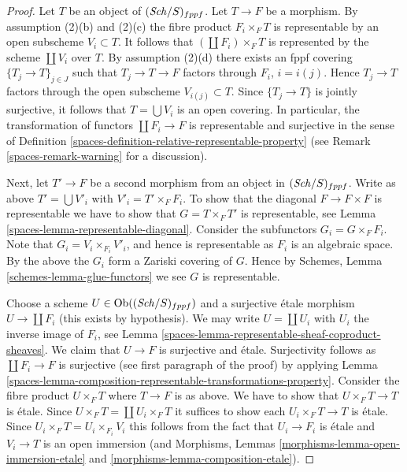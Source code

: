 \begin{proof}

Let $T$ be an object of $(\mathit{Sch}/S)_{fppf}$. Let $T \to F$ be a morphism.
By assumption (2)(b) and (2)(c) the fibre product $F_i \times_F T$
is representable by an open subscheme $V_i \subset T$. It follows that
$(\coprod F_i) \times_F T$ is represented by the scheme $\coprod V_i$ over $T$.
By assumption (2)(d) there exists an fppf covering $\{T_j \to T\}_{j \in J}$
such that $T_j \to T \to F$ factors through $F_i$, $i = i(j)$.
Hence $T_j \to T$ factors through the open subscheme $V_{i(j)} \subset T$.
Since $\{T_j \to T\}$ is jointly surjective, it follows that
$T = \bigcup V_i$ is an open covering. In particular, the transformation
of functors $\coprod F_i \to F$ is representable
and surjective in the sense of
Definition \ref{spaces-definition-relative-representable-property}
(see Remark \ref{spaces-remark-warning} for a discussion).

\medskip\noindent
Next, let $T' \to F$ be a second morphism from an object in $(\mathit{Sch}/S)_{fppf}$.
Write as above $T' = \bigcup V'_i$ with $V'_i = T' \times_F F_i$.
To show that the diagonal $F \to F \times F$ is representable
we have to show that $G = T \times_F T'$ is representable, see
Lemma \ref{spaces-lemma-representable-diagonal}.
Consider the subfunctors $G_i = G \times_F F_i$.
Note that $G_i = V_i \times_{F_i} V'_i$, and hence is representable
as $F_i$ is an algebraic space.
By the above the $G_i$ form a Zariski covering of $G$.
Hence by Schemes, Lemma \ref{schemes-lemma-glue-functors}
we see $G$ is representable.

\medskip\noindent
Choose a scheme $U \in \operatorname{Ob}((\mathit{Sch}/S)_{fppf})$ and a surjective
\'etale morphism $U \to \coprod F_i$ (this exists by hypothesis).
We may write $U = \coprod U_i$ with $U_i$ the inverse image of $F_i$,
see Lemma \ref{spaces-lemma-representable-sheaf-coproduct-sheaves}.
We claim that $U \to F$ is surjective and \'etale. Surjectivity follows
as $\coprod F_i \to F$ is surjective (see first paragraph of the proof)
by applying
Lemma \ref{spaces-lemma-composition-representable-transformations-property}.
Consider the fibre product $U \times_F T$ where $T \to F$ is as
above. We have to show that $U \times_F T \to T$ is \'etale.
Since $U \times_F T = \coprod U_i \times_F T$ it suffices to show
each $U_i \times_F T \to T$ is \'etale. Since
$U_i \times_F T = U_i \times_{F_i} V_i$ this follows from the
fact that $U_i \to F_i$ is \'etale and $V_i \to T$ is an open immersion
(and Morphisms, Lemmas \ref{morphisms-lemma-open-immersion-etale}
and \ref{morphisms-lemma-composition-etale}).
\end{proof}

